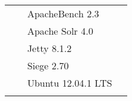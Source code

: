 \begin{longtable}{
>{\arraybackslash}m{0.13\linewidth}
>{\arraybackslash}m{0.77\linewidth}}
 {\textbf{}}&
 {ApacheBench 2.3\index{Apache!ApacheBench} \citep{ApacheBench2012}}\\


 {\textbf{}}&
 {Apache Solr 4.0\index{Apache!Solr} \citep{ApacheSolr2012}}\\


 {\textbf{}}&
 {Jetty 8.1.2\index{Jetty} \citep{Jetty2012}}\\

 
 {\textbf{}}&
 {Siege 2.70\index{Siege} \citep{Fulmer2012}}\\

 
 {\textbf{}}&
 {Ubuntu 12.04.1 LTS\index{Ubuntu}} \citep{Ubuntu122013}\\


 {\textbf{}}&
 {} \\


 \end{longtable}
